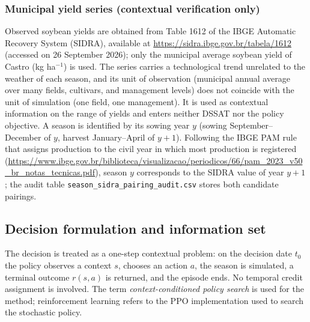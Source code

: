 \documentclass[times,final,authoryear]{elsarticle}
\begin{document}
\subsubsection{Municipal yield series (contextual verification only)}
\label{subsidra}

Observed soybean yields are obtained from Table 1612 of the IBGE Automatic Recovery System (SIDRA), available at \url{https://sidra.ibge.gov.br/tabela/1612} (accessed on 26 September 2026); only the municipal average soybean yield of Castro (kg ha$^{-1}$) is used. The series carries a technological trend unrelated to the weather of each season, and its unit of observation (municipal annual average over many fields, cultivars, and management levels) does not coincide with the unit of simulation (one field, one management). It is used as contextual information on the range of yields and enters neither DSSAT nor the policy objective. A season is identified by its sowing year $y$ (sowing September--December of $y$, harvest January--April of $y+1$). Following the IBGE PAM rule that assigns production to the civil year in which most production is registered (\url{https://www.ibge.gov.br/biblioteca/visualizacao/periodicos/66/pam_2023_v50_br_notas_tecnicas.pdf}), season $y$ corresponds to the SIDRA value of year $y+1$; the audit table \texttt{season\_sidra\_pairing\_audit.csv} stores both candidate pairings.

\subsection{Decision formulation and information set}
\label{subdecision}

The decision is treated as a one-step contextual problem: on the decision date $t_0$ the policy observes a context $s$, chooses an action $a$, the season is simulated, a terminal outcome $r(s,a)$ is returned, and the episode ends. No temporal credit assignment is involved. The term \emph{context-conditioned policy search} is used for the method; reinforcement learning refers to the PPO implementation used to search the stochastic policy.
\end{document}
